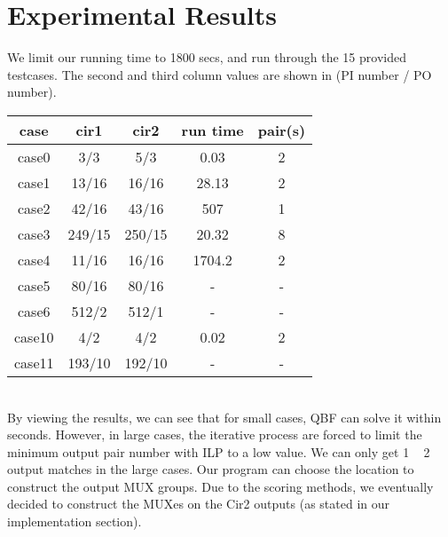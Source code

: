 \section{Experimental Results}

We limit our running time to 1800 secs, and run through the 15 provided testcases. The second and third column values are shown in (PI number / PO number).\\

\begin{tabular}{|c|c|c|c|c|}
\hline
case & cir1 & cir2 & run time & pair(s) \\
\hline
case0 & 3/3 & 5/3 & 0.03 & 2 \\
\hline
case1 & 13/16 & 16/16 & 28.13 & 2 \\
\hline
case2 & 42/16 & 43/16 & 507 & 1 \\
\hline
case3 & 249/15 & 250/15 & 20.32 & 8 \\
\hline
case4 & 11/16 & 16/16 & 1704.2 & 2 \\
\hline
case5 & 80/16 & 80/16 & - & - \\
\hline
case6 & 512/2 & 512/1 & - & - \\
\hline
case10 & 4/2 & 4/2 & 0.02 & 2 \\
\hline
case11 & 193/10 & 192/10 & - & - \\
\hline
\end{tabular}
\\

By viewing the results, we can see that for small cases, QBF can solve it within seconds. However, in large cases, the iterative process are forced to limit the minimum output pair number with ILP to a low value. We can only get 1 ~ 2 output matches in the large cases.
Our program can choose the location to construct the output MUX groups. Due to the scoring methods, we eventually decided to construct the MUXes on the Cir2 outputs (as stated in our implementation section).



